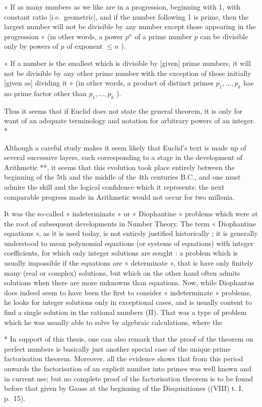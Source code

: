 « If as many numbers as we like are in a progression, beginning with 1, with constant ratio {[}i.e.~geometric{]}, and if the number following 1 is prime, then the largest number will not be divisible by any number except those appearing in the progression » (in other words, a power \(p^n\) of a prime number \(p\) can be divisible only by powers of \(p\) of exponent \(\leqslant n\) ).

« If a number is the smallest which is divisible by {[}given{]} prime numbers, it will not be divisible by any other prime number with the exception of those initially {[}given as{]} dividing it » (in other words, a product of distinct primes \(p_{1}, \ldots, p_{k}\) has no prime factor other than \(p_{1}, \ldots, p_{k}\) ).

Thus it seems that if Euclid does not state the general theorem, it is only for want of an adequate terminology and notation for arbitrary powers of an integer. *

Although a careful study makes it seem likely that Euclid's text is made up of several successive layers, each corresponding to a stage in the development of Arithmetic **, it seems that this evolution took place entirely between the beginning of the 5th and the middle of the 4th centuries B.C., and one must admire the skill and the logical confidence which it represents: the next comparable progress made in Arithmetic would not occur for two millenia.

It was the so-called « indeterminate » or « Diophantine » problems which were at the root of subsequent developments in Number Theory. The term « Diophantine equations », as it is used today, is not entirely justified historically ; it is generally understood to mean polynomial equations (or systems of equations) with integer coefficients, for which only integer solutions are sought : a problem which is usually impossible if the equations are « determinate », that is have only finitely many (real or complex) solutions, but which on the other hand often admits solutions when there are more unknowns than equations. Now, while Diophantus does indeed seem to have been the first to consider « indeterminate » problems, he looks for integer solutions only in exceptional cases, and is usually content to find a single solution in the rational numbers (II). That was a type of problem which he was usually able to solve by algebraic calculations, where the

* In support of this thesis, one can also remark that the proof of the theorem on perfect numbers is basically just another special case of the unique prime factorisation theorem. Moreover, all the evidence shows that from this period onwards the factorisation of an explicit number into primes was well known and in current use; but no complete proof of the factorisation theorem is to be found before that given by Gauss at the beginning of the Disquisitiones ((VIII) t. I, p.~15).

